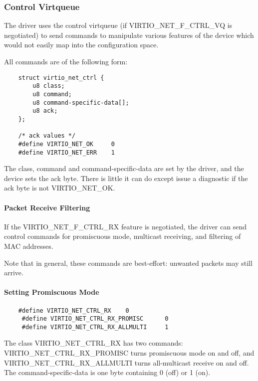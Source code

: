 \subsubsection{Control Virtqueue}\label{sec:Device Types / Network Device / Device Operation / Control Virtqueue}

The driver uses the control virtqueue (if VIRTIO_NET_F_CTRL_VQ is
negotiated) to send commands to manipulate various features of
the device which would not easily map into the configuration
space.

All commands are of the following form:

\begin{lstlisting}
	struct virtio_net_ctrl {
		u8 class;
		u8 command;
		u8 command-specific-data[];
		u8 ack;
	};

	/* ack values */
	#define VIRTIO_NET_OK     0
	#define VIRTIO_NET_ERR    1
\end{lstlisting}

The class, command and command-specific-data are set by the
driver, and the device sets the ack byte. There is little it can
do except issue a diagnostic if the ack byte is not
VIRTIO_NET_OK.

\paragraph{Packet Receive Filtering}\label{sec:Device Types / Network Device / Device Operation / Control Virtqueue / Packet Receive Filtering}

If the VIRTIO_NET_F_CTRL_RX feature is negotiated, the driver can
send control commands for promiscuous mode, multicast receiving,
and filtering of MAC addresses.

Note that in general, these commands are best-effort: unwanted
packets may still arrive.

\paragraph{Setting Promiscuous Mode}\label{sec:Device Types / Network Device / Device Operation / Control Virtqueue / Setting Promiscuous Mode}

\begin{lstlisting}
	#define VIRTIO_NET_CTRL_RX    0
	 #define VIRTIO_NET_CTRL_RX_PROMISC      0
	 #define VIRTIO_NET_CTRL_RX_ALLMULTI     1
\end{lstlisting}

The class VIRTIO_NET_CTRL_RX has two commands:
VIRTIO_NET_CTRL_RX_PROMISC turns promiscuous mode on and off, and
VIRTIO_NET_CTRL_RX_ALLMULTI turns all-multicast receive on and
off. The command-specific-data is one byte containing 0 (off) or
1 (on).

